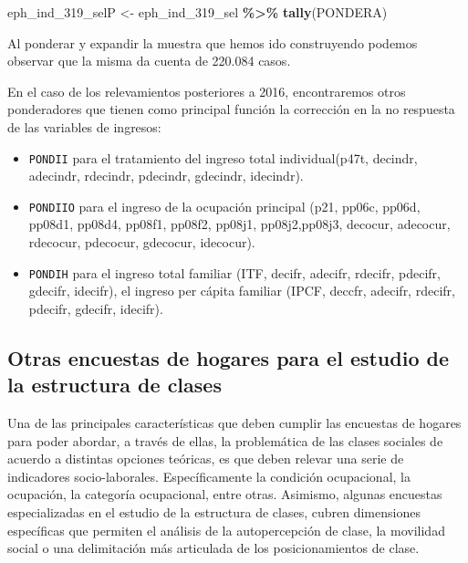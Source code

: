 \documentclass[
]{article}
\newenvironment{Shaded}{\begin{snugshade}}{\end{snugshade}}
\newcommand{\FunctionTok}[1]{\textcolor[rgb]{0.13,0.29,0.53}{\textbf{#1}}}
\newcommand{\NormalTok}[1]{#1}
\newcommand{\OtherTok}[1]{\textcolor[rgb]{0.56,0.35,0.01}{#1}}
\newcommand{\SpecialCharTok}[1]{\textcolor[rgb]{0.81,0.36,0.00}{\textbf{#1}}}
\begin{document}
\begin{Shaded}
\begin{Highlighting}[]
\NormalTok{eph\_ind\_319\_selP }\OtherTok{\textless{}{-}}\NormalTok{ eph\_ind\_319\_sel }\SpecialCharTok{\%\textgreater{}\%}
    \FunctionTok{tally}\NormalTok{(PONDERA)}
\end{Highlighting}
\end{Shaded}

Al ponderar y expandir la muestra que hemos ido construyendo podemos observar que la misma da cuenta de 220.084 casos.

En el caso de los relevamientos posteriores a 2016, encontraremos otros ponderadores que tienen como principal función la corrección en la no respuesta de las variables de ingresos:

\begin{itemize}
\item
  \texttt{PONDII} para el tratamiento del ingreso total individual(p47t, decindr, adecindr, rdecindr, pdecindr,
  gdecindr, idecindr).
\item
  \texttt{PONDIIO} para el ingreso de la ocupación principal (p21, pp06c, pp06d, pp08d1, pp08d4, pp08f1, pp08f2, pp08j1, pp08j2,pp08j3, decocur, adecocur, rdecocur, pdecocur, gdecocur, idecocur).
\item
  \texttt{PONDIH} para el ingreso total familiar (ITF, decifr, adecifr, rdecifr, pdecifr, gdecifr, idecifr), el ingreso per cápita familiar (IPCF, deccfr, adecifr, rdecifr, pdecifr, gdecifr, idecifr).
\end{itemize}

\hypertarget{otras}{%
\subsection{Otras encuestas de hogares para el estudio de la estructura de clases}\label{otras}}

Una de las principales características que deben cumplir las encuestas de hogares para poder abordar, a través de ellas, la problemática de las clases sociales de acuerdo a distintas opciones teóricas, es que deben relevar una serie de indicadores socio-laborales. Específicamente la condición ocupacional, la ocupación, la categoría ocupacional, entre otras. Asimismo, algunas encuestas especializadas en el estudio de la estructura de clases, cubren dimensiones específicas que permiten el análisis de la autopercepción de clase, la movilidad social o una delimitación más articulada de los posicionamientos de clase.
\end{document}

